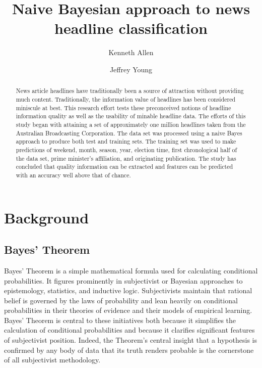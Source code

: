 \documentclass[format=acmlarge]{acmart}
\begin{document}
\title{Naive Bayesian approach to news headline classification}

\author{Kenneth Allen}

\author{Jeffrey Young}

\begin{abstract}
News article headlines have traditionally been a source of attraction without providing much content.  Traditionally, the information value of headlines has been considered miniscule at best. This research effort tests these preconceived notions of headline information quality as well as the usability of minable headline data.  The efforts of this study began with attaining a set of approximately one million headlines taken from the Australian Broadcasting Corporation.  The data set was processed using a naive Bayes approach to produce both test and training sets.  The training set was used to make predictions of weekend, month, season, year, election time, first chronological half of the data set, prime minister's affiliation, and originating publication.  The study has concluded that quality information can be extracted and features can be predicted with an accuracy well above that of chance.
\end{abstract}


\maketitle

\section{Background}
\subsection{Bayes' Theorem}
Bayes' Theorem is a simple mathematical formula used for calculating conditional probabilities. It figures prominently in subjectivist or Bayesian approaches to epistemology, statistics, and inductive logic. Subjectivists maintain that rational belief is governed by the laws of probability and lean heavily on conditional probabilities in their theories of evidence and their models of empirical learning. Bayes' Theorem is central to these initiatives both because it simplifies the calculation of conditional probabilities and because it clarifies significant features of subjectivist position. Indeed, the Theorem's central insight that a hypothesis is confirmed by any body of data that its truth renders probable is the cornerstone of all subjectivist methodology.
\end{document}
